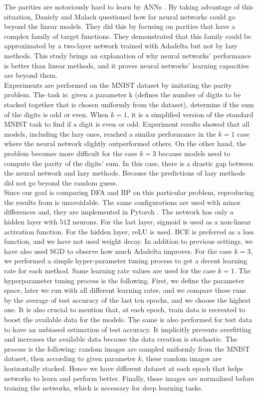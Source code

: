 \documentclass[a4paper, nobind]{templates/ociamthesis}
\begin{document}
The parities are notoriously hard to learn by ANNs \cite{DBLP:journals/corr/abs-1807-06399}. By taking advantage of this situation, Daniely and Malach \cite{DBLP:journals/corr/abs-2002-07400} questioned how far neural networks could go beyond the linear models. They did this by focusing on parities that have a complex family of target functions. They demonstrated that this family could be approximated by a two-layer network trained with Adadelta but not by lazy methods. This study brings an explanation of why neural networks' performance is better than linear methods, and it proves neural networks' learning capacities are beyond them.\\
Experiments are performed on the MNIST dataset by imitating the parity problem. The task is: given a parameter k (defines the number of digits to be stacked together that is chosen uniformly from the dataset), determine if the sum of the digits is odd or even. When \(k=1\), it is a simplified version of the standard MNIST task to find if a digit is even or odd. Experiment results showed that all models, including the lazy ones, reached a similar performance in the \(k=1\) case where the neural network slightly outperformed others. On the other hand, the problem becomes more difficult for the case \(k=3\) because models need to compute the parity of the digits' sum. In this case, there is a drastic gap between the neural network and lazy methods. Because the predictions of lazy methods did not go beyond the random guess.\\
Since our goal is comparing DFA and BP on this particular problem, reproducing the results from \cite{DBLP:journals/corr/abs-2002-07400} is unavoidable. The same configurations are used with minor differences and, they are implemented in Pytorch \cite{NEURIPS2019_9015}. The network has only a hidden layer with \(512\) neurons. For the last layer, sigmoid is used as a non-linear activation function. For the hidden layer, reLU is used. BCE is preferred as a loss function, and we have not used weight decay. In addition to previous settings, we have also used SGD to observe how much Adadelta improves. For the case \(k=3\), we performed a simple hyper-parameter tuning process to get a decent learning rate for each method. Same learning rate values are used for the case \(k=1\). The hyperparameter tuning process is the following. First, we define the parameter space, later we run with all different learning rates, and we compare these runs by the average of test accuracy of the last ten epochs, and we choose the highest one. It is also crucial to mention that, at each epoch, train data is recreated to boost the available data for the models. The same is also performed for test data to have an unbiased estimation of test accuracy. It implicitly prevents overfitting and increases the available data because the data creation is stochastic. The process is the following: random images are sampled uniformly from the MNIST dataset, then according to given parameter \(k\), these random images are horizontally stacked. Hence we have different dataset at each epoch that helps networks to learn and perform better. Finally, these images are normalized before training the networks, which is necessary for deep learning tasks.
\end{document}
